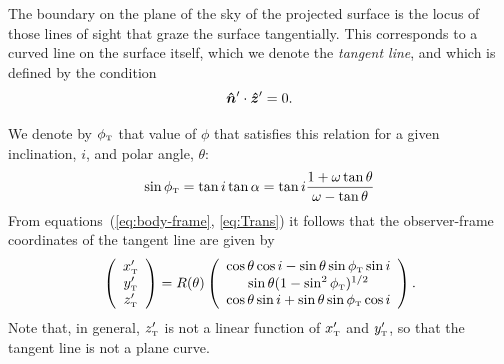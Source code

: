 
The boundary on the plane of the sky of the projected surface is the
locus of those lines of sight that graze the surface tangentially.
This corresponds to a curved line on the surface itself, which we
denote the \textit{tangent line}, and which is defined by the
condition  
\begin{equation}
  \label{eq:tangent-line-condition}
  \bm{\hat{n}}'\cdot \bm{\hat{z}}' = 0.
\end{equation}


We denote by \(\phi_{\mathrm{\scriptscriptstyle T}}\) that value of $\phi$ that satisfies this
relation for a given inclination, \(i\), and polar angle, \(\theta\):
\begin{equation}
\sin\phi_{\mathrm{\scriptscriptstyle T}} = \tan i\tan\alpha = \tan i \frac{1+\omega\tan\theta}{\omega-\tan\theta}
\label{eq:tanphi}
\end{equation}
From equations~(\ref{eq:body-frame}, \ref{eq:Trans}) it follows that
the observer-frame coordinates of the tangent line are given by
\begin{equation}
\left(\begin{array}{c}
x'_{\mathrm{\scriptscriptstyle T}} \\ y'_{\mathrm{\scriptscriptstyle T}} \\ z'_{\mathrm{\scriptscriptstyle T}}
\end{array}\right)= R(\theta)\left(\begin{array}{c}
\cos\theta\cos i - \sin\theta\sin\phi_{\mathrm{\scriptscriptstyle T}} \sin i \\
\sin\theta(1-\sin^2\phi_{\mathrm{\scriptscriptstyle T}})^{1/2} \\
\cos\theta\sin i +\sin\theta\sin\phi_{\mathrm{\scriptscriptstyle T}}\cos i
\end{array}\right).
\label{eq:tangential}
\end{equation} 
Note that, in general, \(z'_{\mathrm{\scriptscriptstyle T}}\) is not a linear function of \(x'_{\mathrm{\scriptscriptstyle T}}\)
and \(y'_{\mathrm{\scriptscriptstyle T}}\), so that the tangent line is not a plane curve. 

